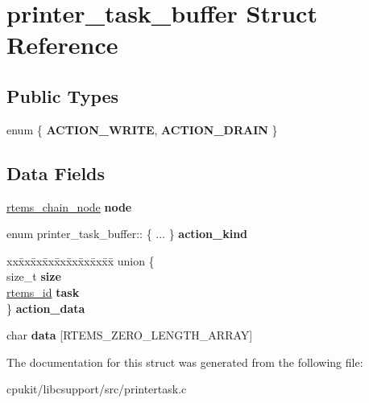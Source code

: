 \hypertarget{structprinter__task__buffer}{}\section{printer\+\_\+task\+\_\+buffer Struct Reference}
\label{structprinter__task__buffer}
\subsection*{Public Types}
\begin{DoxyCompactItemize}
\item 
\mbox{\label{structprinter__task__buffer_a96c848449f39d262cbf6c2cead0a576a}} 
enum \{ {\bfseries A\+C\+T\+I\+O\+N\+\_\+\+W\+R\+I\+TE}, 
{\bfseries A\+C\+T\+I\+O\+N\+\_\+\+D\+R\+A\+IN}
 \}
\end{DoxyCompactItemize}
\subsection*{Data Fields}
\begin{DoxyCompactItemize}
\item 
\mbox{\label{structprinter__task__buffer_a4c42820867426d741b39398ad8c7186a}} 
\mbox{\hyperlink{structChain__Node__struct}{rtems\+\_\+chain\+\_\+node}} {\bfseries node}
\item 
\mbox{\label{structprinter__task__buffer_a06eacaed6eccea43b54b9a2159e43f22}} 
enum printer\+\_\+task\+\_\+buffer\+:: \{ ... \}  {\bfseries action\+\_\+kind}
\item 
\mbox{\label{structprinter__task__buffer_a7a020168a9c77c15f92417d2c52e25ca}} 
\begin{tabbing}
xx\=xx\=xx\=xx\=xx\=xx\=xx\=xx\=xx\=\kill
union \{\\
\>size\_t {\bfseries size}\\
\>\mbox{\hyperlink{group__ClassicTasks_gab20892b814dced7dd4e5b9bf42becd57}{rtems\_id}} {\bfseries task}\\
\} {\bfseries action\_data}\\

\end{tabbing}\item 
\mbox{\label{structprinter__task__buffer_a454e1e6de1e5598f808ea888212f64a0}} 
char {\bfseries data} \mbox{[}R\+T\+E\+M\+S\+\_\+\+Z\+E\+R\+O\+\_\+\+L\+E\+N\+G\+T\+H\+\_\+\+A\+R\+R\+AY\mbox{]}
\end{DoxyCompactItemize}


The documentation for this struct was generated from the following file\+:\begin{DoxyCompactItemize}
\item 
cpukit/libcsupport/src/printertask.\+c\end{DoxyCompactItemize}
